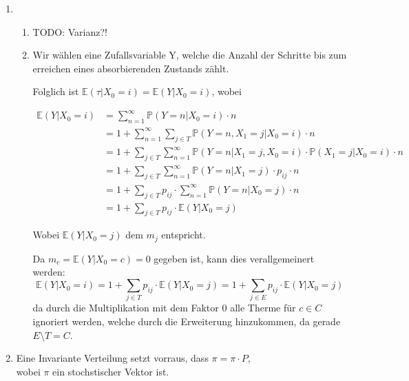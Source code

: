 \documentclass[a4paper]{scrartcl}
\def \blattnr {3}
\begin{document}
\begin{enumerate}[label=\bfseries \blattnr.\arabic*]
   \item
   
    \begin{enumerate}
     \item TODO: Varianz?!
     \item
	Wir wählen eine Zufallsvariable Y, welche die Anzahl der Schritte bis zum erreichen eines absorbierenden Zustands zählt.
	
	Folglich ist $\mathbb{E}(\tau|X_0=i) = \mathbb{E}(Y|X_0=i)$, wobei
	
	\begin{equation*}
	  \begin{split}
	    \mathbb{E}(Y|X_0=i) 
		&= \sum_{n=1}^\infty \mathbb{P}(Y=n|X_0=i) \cdot n \\
		&= 1 + \sum_{n=1}^\infty \sum_{j\in T} \mathbb{P}(Y=n, X_1=j | X_0=i) \cdot n \\
		&= 1 + \sum_{j\in T} \sum_{n=1}^\infty \mathbb{P}(Y=n|X_1 = j, X_0=i) \cdot \mathbb{P}(X_1=j|X_0=i) \cdot n \\
		&= 1 + \sum_{j\in T} \sum_{n=1}^\infty \mathbb{P}(Y=n|X_1 = j) \cdot p_{ij} \cdot n \\
		&= 1 + \sum_{j\in T} p_{ij} \cdot \sum_{n=1}^\infty \mathbb{P}(Y=n|X_0=j) \cdot n \\
		&= 1 + \sum_{j\in T} p_{ij} \cdot \mathbb{E}(Y|X_0=j)
	  \end{split}
	\end{equation*}
	
	Wobei $\mathbb{E}(Y|X_0=j)$ dem $m_j$ entspricht.
	
	Da $m_c = \mathbb{E}(Y|X_0=c) = 0$ gegeben ist, kann dies verallgemeinert werden:
	$$ \mathbb{E}(Y|X_0=i) = 1 + \sum_{j\in T} p_{ij} \cdot \mathbb{E}(Y|X_0=j) = 1 + \sum_{j\in E} p_{ij} \cdot \mathbb{E}(Y|X_0=j)$$
	da durch die Multiplikation mit dem Faktor 0 alle Therme für $c \in C$ ignoriert werden, welche durch die Erweiterung hinzukommen, da gerade $E\setminus T=C$.

    \end{enumerate}

   

   \item 
   
     Eine Invariante Verteilung setzt vorraus, dass $\pi = \pi \cdot P$,\\ wobei $\pi$ ein stochstischer Vektor ist.
   

\end{enumerate}
\end{document}
